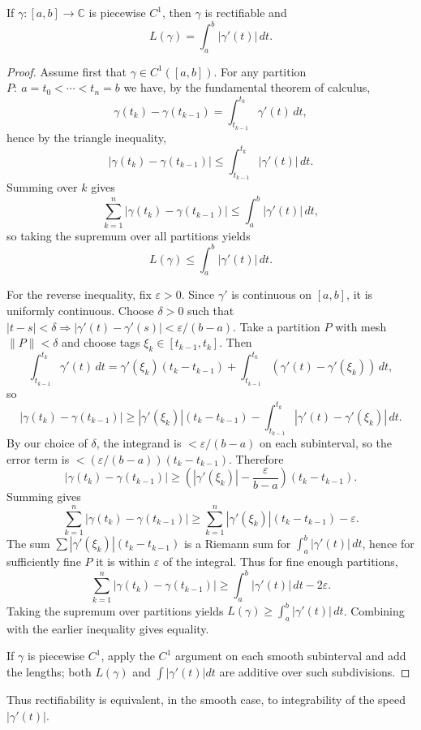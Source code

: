 \documentclass{article}
\begin{document}
\begin{theorem}
If $\gamma:[a,b]\to\mathbb C$ is piecewise $C^1$, then $\gamma$ is rectifiable and
\[
L(\gamma)=\int_a^b |\gamma'(t)|\,dt.
\]
\end{theorem}

\begin{proof}
Assume first that $\gamma\in C^1([a,b])$. For any partition
$P:\ a=t_0<\cdots<t_n=b$ we have, by the fundamental theorem of calculus,
\[
\gamma(t_k)-\gamma(t_{k-1})=\int_{t_{k-1}}^{t_k}\gamma'(t)\,dt,
\]
hence by the triangle inequality,
\[
|\gamma(t_k)-\gamma(t_{k-1})|
\le \int_{t_{k-1}}^{t_k}|\gamma'(t)|\,dt.
\]
Summing over $k$ gives
\[
\sum_{k=1}^n |\gamma(t_k)-\gamma(t_{k-1})|
\le \int_a^b |\gamma'(t)|\,dt,
\]
so taking the supremum over all partitions yields
\[
L(\gamma)\le \int_a^b |\gamma'(t)|\,dt.
\]

For the reverse inequality, fix $\varepsilon>0$. Since $\gamma'$ is continuous on
$[a,b]$, it is uniformly continuous. Choose $\delta>0$ such that
$|t-s|<\delta \Rightarrow |\gamma'(t)-\gamma'(s)|<\varepsilon/(b-a)$.
Take a partition $P$ with mesh $\|P\|<\delta$ and choose tags $\xi_k\in[t_{k-1},t_k]$.
Then
\[
\int_{t_{k-1}}^{t_k}\gamma'(t)\,dt
=\gamma'(\xi_k)(t_k-t_{k-1})+\int_{t_{k-1}}^{t_k}(\gamma'(t)-\gamma'(\xi_k))\,dt,
\]
so
\[
|\gamma(t_k)-\gamma(t_{k-1})|
\ge |\gamma'(\xi_k)|(t_k-t_{k-1})-\int_{t_{k-1}}^{t_k}|\gamma'(t)-\gamma'(\xi_k)|\,dt.
\]
By our choice of $\delta$, the integrand is $<\varepsilon/(b-a)$ on each subinterval,
so the error term is $<(\varepsilon/(b-a))(t_k-t_{k-1})$.
Therefore
\[
|\gamma(t_k)-\gamma(t_{k-1})|
\ge \left(|\gamma'(\xi_k)|-\frac{\varepsilon}{b-a}\right)(t_k-t_{k-1}).
\]
Summing gives
\[
\sum_{k=1}^n |\gamma(t_k)-\gamma(t_{k-1})|
\ge \sum_{k=1}^n |\gamma'(\xi_k)|(t_k-t_{k-1})-\varepsilon.
\]
The sum $\sum |\gamma'(\xi_k)|(t_k-t_{k-1})$ is a Riemann sum for
$\int_a^b |\gamma'(t)|\,dt$, hence for sufficiently fine $P$ it is within $\varepsilon$
of the integral. Thus for fine enough partitions,
\[
\sum_{k=1}^n |\gamma(t_k)-\gamma(t_{k-1})|
\ge \int_a^b |\gamma'(t)|\,dt -2\varepsilon.
\]
Taking the supremum over partitions yields $L(\gamma)\ge \int_a^b |\gamma'(t)|\,dt$.
Combining with the earlier inequality gives equality.

If $\gamma$ is piecewise $C^1$, apply the $C^1$ argument on each smooth subinterval
and add the lengths; both $L(\gamma)$ and $\int |\gamma'(t)|dt$ are additive over such
subdivisions.
\end{proof}
Thus rectifiability is equivalent, in the smooth case, to integrability of the speed $\lvert \gamma'(t)\rvert$.
\end{document}
